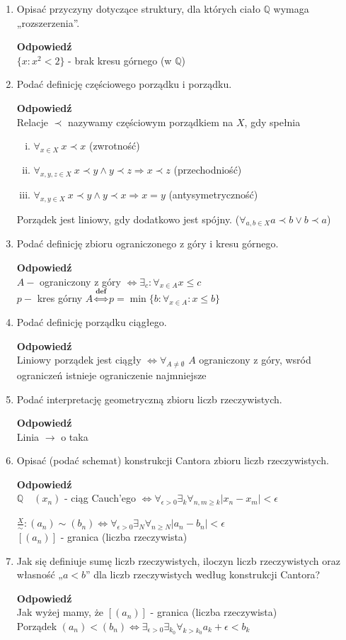 \documentclass[12pt,a4paper]{article}
\theoremstyle{break}
\newcommand{\Odp}[1]{
		\begin{mdframed}[style=zadanie]
			\textbf{Odpowiedź}\\
			#1
		\end{mdframed}
	}
\begin{document}
\begin{enumerate}[1.]
	\item Opisać przyczyny dotyczące struktury, dla których ciało $\mathbb{Q}$ wymaga „rozszerzenia”.
	\Odp{
		$\{ x: x^2<2\}$ - brak kresu górnego (w $\mathbb{Q}$)
	}
	\newpage
	\item Podać definicję częściowego porządku i porządku.
	\Odp{
		Relacje $\prec$ nazywamy częściowym porządkiem na $X$, gdy spełnia
		\begin{enumerate}[i)]
			\item $\forall_{x \in X} \:x \prec x$ (zwrotność)
			\item $\forall_{x,y,z \in X} \: x\prec y \wedge y\prec z \Rightarrow x\prec z$ (przechodniość)
			\item $\forall_{x,y\in X} \: x\prec y \wedge y \prec x \Rightarrow x = y$ (antysymetryczność)
		\end{enumerate}
		
		Porządek jest liniowy, gdy dodatkowo jest spójny. ($\forall_{a,b \in X} a\prec b \vee b \prec a$)
	}
	
	\item Podać definicję zbioru ograniczonego z góry i kresu górnego.
	\Odp{
	$A-$ ograniczony z góry $\Leftrightarrow \exists_c : \forall_{x\in A} x\leq c$\\
	$p-$ kres górny $A \overset{\textbf{def}}{\Leftrightarrow} p=\min\{b:\forall_{x\in A} : x\leq b\}$
	}
	
	\item Podać definicję porządku ciągłego.
	\Odp{
	Liniowy porządek jest ciągły $\Leftrightarrow \forall_{A\neq \emptyset}$ $A$ ograniczony z góry, wsród ograniczeń istnieje ograniczenie najmniejsze
	}
	
	\item Podać interpretację geometryczną zbioru liczb rzeczywistych.
	\Odp{
	Linia $\longrightarrow$ o taka
	}
	
	\item Opisać (podać schemat) konstrukcji Cantora zbioru liczb rzeczywistych.
	\Odp{
		$\mathbb{Q} \quad (x_n)$ - ciąg Cauch'ego $\Leftrightarrow \forall_{\epsilon>0} \exists_{k} \forall_{n,m\geq k} |x_n-x_m|<\epsilon$
		
		$\frac{X}{\sim}: (a_n)\sim(b_n) \Leftrightarrow \forall_{\epsilon>0} \exists_N \forall_{n\geq N} |a_n-b_n|<\epsilon$\\
		$[(a_n)]$ - granica (liczba rzeczywista)
	}
	
	\item Jak się definiuje sumę liczb rzeczywistych, iloczyn liczb rzeczywistych oraz własność „$a < b$” dla liczb rzeczywistych według konstrukcji Cantora?
	\Odp{
		Jak wyżej mamy, że $[(a_n)]$ - granica (liczba rzeczywista)\\
		Porządek $(a_n) < (b_n) \Leftrightarrow \exists_{\epsilon>0} \exists_{k_0} \forall_{k>k_0} a_k + \epsilon < b_k$
		
}
\end{enumerate}
\end{document}
